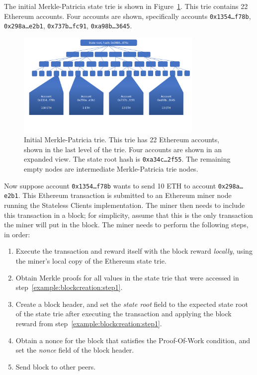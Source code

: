 \documentclass[12pt]{article}
\newcommand{\System}{Stateless Clients\xspace}
\newcommand{\figurewidth}{0.8\textwidth}
\begin{document}
The initial Merkle-Patricia state trie is shown in Figure~\ref{fig:example:initial}. This trie contains 22 Ethereum accounts. Four accounts are shown, specifically accounts \texttt{0x1354\ldots f78b}, \texttt{0x298a\ldots e2b1}, \texttt{0x737b\ldots fc91}, \texttt{0xa98b\ldots 3645}.
\begin{figure}[H]
  \centering
  \includegraphics[width=\figurewidth,page=1]{../figures/design/example.pdf}
  \caption{Initial Merkle-Patricia trie. This trie has 22 Ethereum accounts, shown in the last level of the trie. Four accounts are shown in an expanded view. The state root hash is \texttt{0xa34c\ldots 2f55}. The remaining empty nodes are intermediate Merkle-Patricia trie nodes.}
  \label{fig:example:initial}
\end{figure}

Now suppose account \texttt{0x1354\ldots f78b} wants to send 10 ETH to account \texttt{0x298a\ldots e2b1}. This Ethereum transaction is submitted to an Ethereum miner node running the \System implementation. The miner then needs to include this transaction in a block; for simplicity, assume that this is the only transaction the miner will put in the block. The miner needs to perform the following steps, in order:
\begin{enumerate}
  \item Execute the transaction and reward itself with the block reward \emph{locally}, using the miner's local copy of the Ethereum state trie. \label{example:blockcreation:step1}
  \item Obtain Merkle proofs for all values in the state trie that were accessed in step~\ref{example:blockcreation:step1}.
  \item Create a block header, and set the \emph{state root} field to the expected state root of the state trie after executing the transaction and applying the block reward from step~\ref{example:blockcreation:step1}.
  \item Obtain a nonce for the block that satisfies the Proof-Of-Work condition, and set the \emph{nonce} field of the block header.
  \item Send block to other peers.
\end{enumerate}
\end{document}
